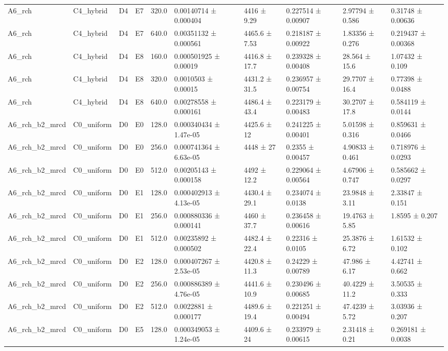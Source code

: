 \begin{table}
\begin{tabular}{llllllllll}
A6\_rch & C4\_hybrid & D4 & E7 & 320.0 & 0.00140714 ± 0.000404 & 4416 ± 9.29 & 0.227514 ± 0.00907 & 2.97794 ± 0.586 & 0.31748 ± 0.00636 \\
A6\_rch & C4\_hybrid & D4 & E7 & 640.0 & 0.00351132 ± 0.000561 & 4465.6 ± 7.53 & 0.218187 ± 0.00922 & 1.83356 ± 0.276 & 0.219437 ± 0.00368 \\
A6\_rch & C4\_hybrid & D4 & E8 & 160.0 & 0.000501925 ± 0.00019 & 4416.8 ± 17.7 & 0.239328 ± 0.00408 & 28.564 ± 15.6 & 1.07432 ± 0.109 \\
A6\_rch & C4\_hybrid & D4 & E8 & 320.0 & 0.0010503 ± 0.00015 & 4431.2 ± 31.5 & 0.236957 ± 0.00754 & 29.7707 ± 16.4 & 0.77398 ± 0.0488 \\
A6\_rch & C4\_hybrid & D4 & E8 & 640.0 & 0.00278558 ± 0.000161 & 4486.4 ± 43.4 & 0.223179 ± 0.00483 & 30.2707 ± 17.8 & 0.584119 ± 0.0144 \\
A6\_rch\_b2\_mrcd & C0\_uniform & D0 & E0 & 128.0 & 0.000340434 ± 1.47e-05 & 4425.6 ± 12 & 0.241225 ± 0.00401 & 5.01598 ± 0.316 & 0.859631 ± 0.0466 \\
A6\_rch\_b2\_mrcd & C0\_uniform & D0 & E0 & 256.0 & 0.000741364 ± 6.63e-05 & 4448 ± 27 & 0.2355 ± 0.00457 & 4.90833 ± 0.461 & 0.718976 ± 0.0293 \\
A6\_rch\_b2\_mrcd & C0\_uniform & D0 & E0 & 512.0 & 0.00205143 ± 0.000158 & 4492 ± 12.2 & 0.229064 ± 0.00564 & 4.67906 ± 0.747 & 0.585662 ± 0.0297 \\
A6\_rch\_b2\_mrcd & C0\_uniform & D0 & E1 & 128.0 & 0.000402913 ± 4.13e-05 & 4430.4 ± 29.1 & 0.234074 ± 0.0138 & 23.9848 ± 3.11 & 2.33847 ± 0.151 \\
A6\_rch\_b2\_mrcd & C0\_uniform & D0 & E1 & 256.0 & 0.000880336 ± 0.000141 & 4460 ± 37.7 & 0.236458 ± 0.00616 & 19.4763 ± 5.85 & 1.8595 ± 0.207 \\
A6\_rch\_b2\_mrcd & C0\_uniform & D0 & E1 & 512.0 & 0.00235892 ± 0.000502 & 4482.4 ± 22.4 & 0.22316 ± 0.0105 & 25.3876 ± 6.72 & 1.61532 ± 0.102 \\
A6\_rch\_b2\_mrcd & C0\_uniform & D0 & E2 & 128.0 & 0.000407267 ± 2.53e-05 & 4420.8 ± 11.3 & 0.24229 ± 0.00789 & 47.986 ± 6.17 & 4.42741 ± 0.662 \\
A6\_rch\_b2\_mrcd & C0\_uniform & D0 & E2 & 256.0 & 0.000886389 ± 4.76e-05 & 4441.6 ± 10.9 & 0.230496 ± 0.00685 & 40.4229 ± 11.2 & 3.50535 ± 0.333 \\
A6\_rch\_b2\_mrcd & C0\_uniform & D0 & E2 & 512.0 & 0.0022881 ± 0.000177 & 4489.6 ± 19.4 & 0.221251 ± 0.00494 & 47.4239 ± 5.72 & 3.03936 ± 0.207 \\
A6\_rch\_b2\_mrcd & C0\_uniform & D0 & E5 & 128.0 & 0.000349053 ± 1.24e-05 & 4409.6 ± 24 & 0.233979 ± 0.00615 & 2.31418 ± 0.21 & 0.269181 ± 0.0038 \\

\end{tabular}
\end{table}
